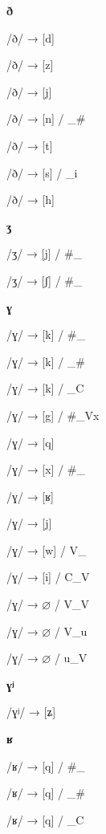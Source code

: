\begin{center}\textbf{ð}\end{center}
\begin{multicols}{4}
\noindent /ð/ → [d]

\noindent /ð/ → [z]

\noindent /ð/ → [j]

\noindent /ð/ → [n] / \_\#

\noindent /ð/ → [t]

\noindent /ð/ → [s] / \_i

\noindent /ð/ → [h]
\end{multicols}

\begin{center}\textbf{ʒ}\end{center}
\begin{multicols}{4}
\noindent /ʒ/ → [j] / \#\_

\noindent /ʒ/ → [ʃ] / \#\_
\end{multicols}

\begin{center}\textbf{ɣ}\end{center}
\begin{multicols}{4}
\noindent /ɣ/ → [k] / \#\_

\noindent /ɣ/ → [k] / \_\#

\noindent /ɣ/ → [k] / \_C

\noindent /ɣ/ → [g] / \#\_Vx

\noindent /ɣ/ → [q]

\noindent /ɣ/ → [x] / \#\_

\noindent /ɣ/ → [ʁ]

\noindent /ɣ/ → [j]

\noindent /ɣ/ → [w] / V\_

\noindent /ɣ/ → [i] / C\_V

\noindent /ɣ/ → $\varnothing$ / V\_V

\noindent /ɣ/ → $\varnothing$ / V\_u

\noindent /ɣ/ → $\varnothing$ / u\_V
\end{multicols}


\begin{center}\textbf{ɣʲ}\end{center}
\begin{multicols}{4}
\noindent /ɣʲ/ → [ʑ]
\end{multicols}


\begin{center}\textbf{ʁ}\end{center}
\begin{multicols}{4}
\noindent /ʁ/ → [q] / \#\_

\noindent /ʁ/ → [q] / \_\#

\noindent /ʁ/ → [q] / \_C
\end{multicols}


